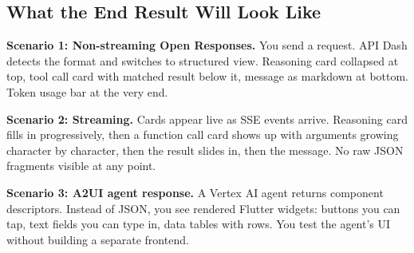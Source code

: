 \documentclass[11pt,a4paper]{article}
\begin{document}
\begin{center}
{%
}%
\end{center}
\vspace{4pt}

\subsection{What the End Result Will Look Like}

\textbf{Scenario 1: Non-streaming Open Responses.} You send a request. API Dash detects the format and switches to structured view. Reasoning card collapsed at top, tool call card with matched result below it, message as markdown at bottom. Token usage bar at the very end.

\textbf{Scenario 2: Streaming.} Cards appear live as SSE events arrive. Reasoning card fills in progressively, then a function call card shows up with arguments growing character by character, then the result slides in, then the message. No raw JSON fragments visible at any point.

\textbf{Scenario 3: A2UI agent response.} A Vertex AI agent returns component descriptors. Instead of JSON, you see rendered Flutter widgets: buttons you can tap, text fields you can type in, data tables with rows. You test the agent's UI without building a separate frontend.
\end{document}
